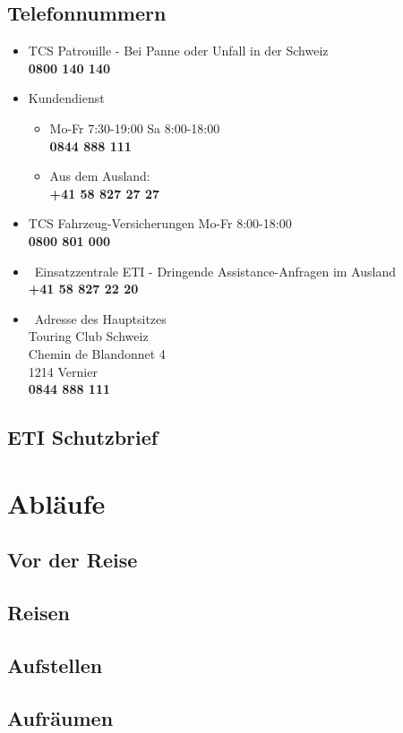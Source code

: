 \subsection{Telefonnummern}
\begin{itemize}
    \item TCS Patrouille - Bei Panne oder Unfall in der Schweiz \\ \textbf{0800 140 140}
     \item Kundendienst 
\begin{itemize}
    \item Mo-Fr 7:30-19:00 Sa 8:00-18:00 \\ \textbf{0844 888 111}
    \item Aus dem Ausland: \\ \textbf{+41 58 827 27 27}
\end{itemize} 
\item TCS Fahrzeug-Versicherungen Mo-Fr 8:00-18:00 \\ \textbf{0800 801 000}
\item\ Einsatzzentrale ETI - Dringende Assistance-Anfragen im Ausland \\ \textbf{+41 58 827 22 20}
\item\ Adresse des Hauptsitzes \\
Touring Club Schweiz \\
Chemin de Blandonnet 4 \\
1214 Vernier \\
\textbf{0844 888 111}
\end{itemize} 

\subsection{ETI Schutzbrief}
\newpage
\section{Abläufe}
\subsection{Vor der Reise}
\subsection{Reisen}
\subsection{Aufstellen}

\subsection{Aufräumen}
